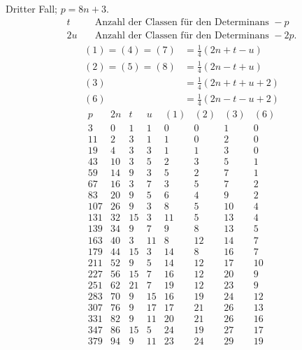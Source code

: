 Dritter Fall; $p=8n+3$.
\[
\begin{aligned}
t&\quad\text{Anzahl der Classen für den Determinans }-p\\
2u&\quad\text{Anzahl der Classen für den Determinans }-2p.
\end{aligned}
\]
\[
\begin{aligned}
(1)=(4)=(7)&=\tfrac14(2n+t-u)\\
(2)=(5)=(8)&=\tfrac14(2n-t+u)\\
(3)&=\tfrac14(2n+t+u+2)\\
(6)&=\tfrac14(2n-t-u+2)
\end{aligned}
\]
\[
\begin{array}{r|r|r|r|r|r|r|r}
p&2n&t&u&(1)&(2)&(3)&(6)\\\hline
3&0&1&1&0&0&1&0\\
11&2&3&1&1&0&2&0\\
19&4&3&3&1&1&3&0\\
43&10&3&5&2&3&5&1\\
59&14&9&3&5&2&7&1\\
67&16&3&7&3&5&7&2\\
83&20&9&5&6&4&9&2\\
107&26&9&3&8&5&10&4\\
131&32&15&3&11&5&13&4\\
139&34&9&7&9&8&13&5\\
163&40&3&11&8&12&14&7\\
179&44&15&3&14&8&16&7\\
211&52&9&5&14&12&17&10\\
227&56&15&7&16&12&20&9\\
251&62&21&7&19&12&23&9\\
283&70&9&15&16&19&24&12\\
307&76&9&17&17&21&26&13\\
331&82&9&11&20&21&26&16\\
347&86&15&5&24&19&27&17\\
379&94&9&11&23&24&29&19
\end{array}
\]

